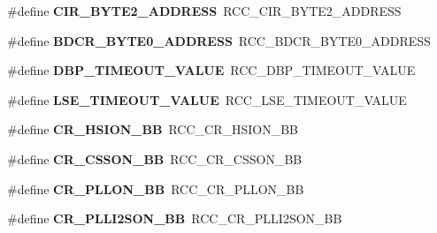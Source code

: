 \begin{DoxyCompactItemize}
\#define {\bfseries C\+I\+R\+\_\+\+B\+Y\+T\+E2\+\_\+\+A\+D\+D\+R\+E\+SS}~R\+C\+C\+\_\+\+C\+I\+R\+\_\+\+B\+Y\+T\+E2\+\_\+\+A\+D\+D\+R\+E\+SS
\item 
\mbox{\label{group___h_a_l___r_c_c___aliased_ga991be15dda03061a29712e8206a32510}} 
\#define {\bfseries B\+D\+C\+R\+\_\+\+B\+Y\+T\+E0\+\_\+\+A\+D\+D\+R\+E\+SS}~R\+C\+C\+\_\+\+B\+D\+C\+R\+\_\+\+B\+Y\+T\+E0\+\_\+\+A\+D\+D\+R\+E\+SS
\item 
\mbox{\label{group___h_a_l___r_c_c___aliased_ga3508fa29d62b42d7d9117c419e076efc}} 
\#define {\bfseries D\+B\+P\+\_\+\+T\+I\+M\+E\+O\+U\+T\+\_\+\+V\+A\+L\+UE}~R\+C\+C\+\_\+\+D\+B\+P\+\_\+\+T\+I\+M\+E\+O\+U\+T\+\_\+\+V\+A\+L\+UE
\item 
\mbox{\label{group___h_a_l___r_c_c___aliased_ga0965572baea57cdfd3616bef14d41053}} 
\#define {\bfseries L\+S\+E\+\_\+\+T\+I\+M\+E\+O\+U\+T\+\_\+\+V\+A\+L\+UE}~R\+C\+C\+\_\+\+L\+S\+E\+\_\+\+T\+I\+M\+E\+O\+U\+T\+\_\+\+V\+A\+L\+UE
\item 
\mbox{\label{group___h_a_l___r_c_c___aliased_gac3290a833c0e35ec17d32c2d494e6133}} 
\#define {\bfseries C\+R\+\_\+\+H\+S\+I\+O\+N\+\_\+\+BB}~R\+C\+C\+\_\+\+C\+R\+\_\+\+H\+S\+I\+O\+N\+\_\+\+BB
\item 
\mbox{\label{group___h_a_l___r_c_c___aliased_gaca914aed10477ae4090fea0a9639b1ea}} 
\#define {\bfseries C\+R\+\_\+\+C\+S\+S\+O\+N\+\_\+\+BB}~R\+C\+C\+\_\+\+C\+R\+\_\+\+C\+S\+S\+O\+N\+\_\+\+BB
\item 
\mbox{\label{group___h_a_l___r_c_c___aliased_ga3f1fb2589cb8b5ac2f7121aba1135a5f}} 
\#define {\bfseries C\+R\+\_\+\+P\+L\+L\+O\+N\+\_\+\+BB}~R\+C\+C\+\_\+\+C\+R\+\_\+\+P\+L\+L\+O\+N\+\_\+\+BB
\item 
\mbox{\label{group___h_a_l___r_c_c___aliased_ga0c0fb27aba4eb660f7590252596bdfc5}} 
\#define {\bfseries C\+R\+\_\+\+P\+L\+L\+I2\+S\+O\+N\+\_\+\+BB}~R\+C\+C\+\_\+\+C\+R\+\_\+\+P\+L\+L\+I2\+S\+O\+N\+\_\+\+BB
\item 
\mbox{\label{group___h_a_l___r_c_c___aliased_gac80b5fd1d6f839cc29c9272d47742907}} 

\end{DoxyCompactItemize}
